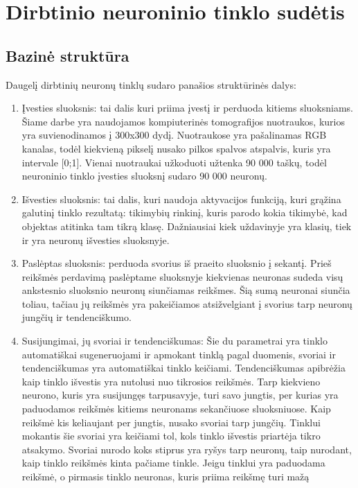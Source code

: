 \documentclass{VUMIFInfKursinis}
\begin{document}
\tableofcontents

\section{Dirbtinio neuroninio tinklo sudėtis}
\subsection{Bazinė struktūra}
Daugelį dirbtinių neuronų tinklų sudaro panašios struktūrinės dalys:
\begin{enumerate}
  \item Įvesties sluoksnis: tai dalis kuri priima įvestį ir perduoda kitiems sluoksniams.
  Šiame darbe yra naudojamos kompiuterinės tomografijos nuotraukos, kurios yra suvienodinamos
  į 300x300 dydį. Nuotraukose yra pašalinamas RGB kanalas, todėl kiekvieną pikselį nusako
  pilkos spalvos atspalvis, kuris yra intervale [0;1]. Vienai nuotraukai užkoduoti
  užtenka 90 000 taškų, todėl neuroninio tinklo įvesties sluoksnį sudaro 90 000 neuronų.
  \item Išvesties sluoksnis: tai dalis, kuri naudoja aktyvacijos funkciją, kuri grąžina galutinį tinklo rezultatą: tikimybių rinkinį,
  kuris parodo kokia tikimybė, kad objektas atitinka tam tikrą klasę. Dažniausiai kiek
  uždavinyje yra klasių, tiek ir yra neuronų išvesties sluoksnyje.
  \item Paslėptas sluoksnis: perduoda svorius iš praeito sluoksnio į sekantį. Prieš reikšmės perdavimą paslėptame
  sluoksnyje kiekvienas neuronas sudeda visų ankstesnio sluoksnio neuronų siunčiamas reikšmes. Šią sumą
  neuronai siunčia toliau, tačiau jų reikšmės yra pakeičiamos atsižvelgiant į svorius tarp neuronų jungčių ir
  tendenciškumo.
  \item Susijungimai, jų svoriai ir tendenciškumas: Šie du parametrai yra
  tinklo automatiškai sugeneruojami ir apmokant tinklą pagal
  duomenis, svoriai ir tendenciškumas
  yra automatiškai tinklo keičiami. Tendenciškumas apibrėžia kaip tinklo išvestis yra nutolusi
  nuo tikrosios reikšmės. Tarp
  kiekvieno neurono, kuris yra susijungęs tarpusavyje, turi savo jungtis, per
  kurias yra paduodamos reikšmės kitiems neuronams sekančiuose sluoksniuose.
  Kaip reikšmė kis keliaujant per jungtis, nusako svoriai tarp jungčių. Tinklui mokantis
  šie svoriai yra keičiami tol, kols tinklo išvestis priartėja tikro atsakymo. Svoriai
  nurodo koks stiprus yra ryšys tarp neuronų, taip nurodant, kaip tinklo reikšmės kinta pačiame tinkle.
  Jeigu tinklui yra paduodama reikšmė, o pirmasis tinklo neuronas, kuris priima reikšmę turi mažą

\end{enumerate}
\end{document}

